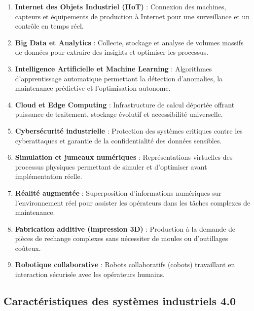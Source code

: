 \begin{enumerate}
    \item \textbf{Internet des Objets Industriel (IIoT)} : Connexion des machines, capteurs et équipements de production à Internet pour une surveillance et un contrôle en temps réel.
    
    \item \textbf{Big Data et Analytics} : Collecte, stockage et analyse de volumes massifs de données pour extraire des insights et optimiser les processus.
    
    \item \textbf{Intelligence Artificielle et Machine Learning} : Algorithmes d'apprentissage automatique permettant la détection d'anomalies, la maintenance prédictive et l'optimisation autonome.
    
    \item \textbf{Cloud et Edge Computing} : Infrastructure de calcul déportée offrant puissance de traitement, stockage évolutif et accessibilité universelle.
    
    \item \textbf{Cybersécurité industrielle} : Protection des systèmes critiques contre les cyberattaques et garantie de la confidentialité des données sensibles.
    
    \item \textbf{Simulation et jumeaux numériques} : Représentations virtuelles des processus physiques permettant de simuler et d'optimiser avant implémentation réelle.
    
    \item \textbf{Réalité augmentée} : Superposition d'informations numériques sur l'environnement réel pour assister les opérateurs dans les tâches complexes de maintenance.
    
    \item \textbf{Fabrication additive (impression 3D)} : Production à la demande de pièces de rechange complexes sans nécessiter de moules ou d'outillages coûteux.
    
    \item \textbf{Robotique collaborative} : Robots collaboratifs (cobots) travaillant en interaction sécurisée avec les opérateurs humains.
\end{enumerate}



\subsection{Caractéristiques des systèmes industriels 4.0}

